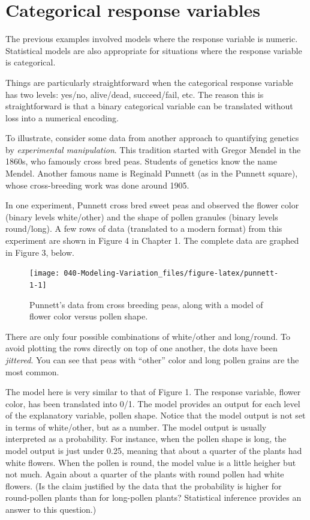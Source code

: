 \documentclass[]{book}
\begin{document}
\hypertarget{categorical-response-variables}{%
\section{Categorical response variables}\label{categorical-response-variables}}

The previous examples involved models where the response variable is numeric. Statistical models are also appropriate for situations where the response variable is categorical.

Things are particularly straightforward when the categorical response variable has two levels: yes/no, alive/dead, succeed/fail, etc. The reason this is straightforward is that a binary categorical variable can be translated without loss into a numerical encoding.

To illustrate, consider some data from another approach to quantifying genetics by \emph{experimental manipulation}. This tradition started with Gregor Mendel in the 1860s, who famously cross bred peas. Students of genetics know the name Mendel. Another famous name is Reginald Punnett (as in the Punnett square), whose cross-breeding work was done around 1905.

In one experiment, Punnett cross bred sweet peas and observed the flower color (binary levels white/other) and the shape of pollen granules (binary levels round/long). A few rows of data (translated to a modern format) from this experiment are shown in Figure 4 in Chapter 1. The complete data are graphed in Figure 3, below.

\begin{figure}\texttt{[image: 040-Modeling-Variation\_files/figure-latex/punnett-1-1]} \caption{Punnett's data from cross breeding peas, along with a model of flower color versus pollen shape.}\label{fig:punnett-1}
\end{figure}

There are only four possible combinations of white/other and long/round. To avoid plotting the rows directly on top of one another, the dots have been \emph{jittered}. You can see that peas with ``other'' color and long pollen grains are the most common.

The model here is very similar to that of Figure 1. The response variable, flower color, has been translated into 0/1. The model provides an output for each level of the explanatory variable, pollen shape. Notice that the model output is not set in terms of white/other, but as a number. The model output is usually interpreted as a probability. For instance, when the pollen shape is long, the model output is just under 0.25, meaning that about a quarter of the plants had white flowers. When the pollen is round, the model value is a little heigher but not much. Again about a quarter of the plants with round pollen had white flowers. (Is the claim justified by the data that the probability is higher for round-pollen plants than for long-pollen plants? Statistical inference provides an answer to this question.)
\end{document}
